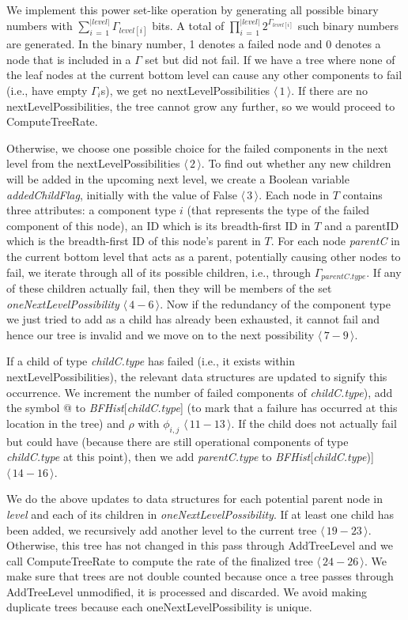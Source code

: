 \documentclass[12pt]{article}
\newcommand{\varName}[1]{\textrm{\it#1}}
\newcommand{\citeLine}[1]{$\langle \, #1 \, \rangle$}
\newcommand{\citeBlock}[2]{$\langle \, #1 - #2 \, \rangle$}
\begin{document}
We implement this power set-like operation by generating all possible binary numbers with $\sum\limits_{i \, = \, 1}^{|level|}\Gamma_{level[i]}$ bits. A total of $\prod\limits_{i \, = \, 1}^{|level|}2^{\Gamma_{level[i]}}$ such binary numbers are generated. In the binary number, 1 denotes a failed node and 0 denotes a node that is included in a $\Gamma$ set but did not fail. If we have a tree where none of the leaf nodes at the current bottom level can cause any other components to fail (i.e., have empty $\Gamma_{i}$s), we get no nextLevelPossibilities \citeLine{1}. If there are no nextLevelPossibilities, the tree cannot grow any further, so we would proceed to ComputeTreeRate. 

Otherwise, we choose one possible choice for the failed components in the next level from the nextLevelPossibilities \citeLine{2}. To find out whether any new children will be added in the upcoming next level, we create a Boolean variable \varName{addedChildFlag}, initially with the value of False \citeLine{3}. Each node in $T$ contains three attributes: a component type $i$ (that represents the type of the failed component of this node), an ID which is its breadth-first ID in $T$ and a parentID which is the breadth-first ID of this node's parent in $T$. For each node \varName{parentC} in the current bottom level that acts as a parent, potentially causing other nodes to fail, we iterate through all of its possible children, i.e., through $\Gamma_{parentC.type}$. If any of these children actually fail, then they will be members of the set \varName{oneNextLevelPossibility} \citeBlock{4}{6}. Now if the redundancy of the component type we just tried to add as a child has already been exhausted, it cannot fail and hence our tree is invalid and we move on to the next possibility \citeBlock{7}{9}.

If a child of type \varName{childC.type} has failed (i.e., it exists within nextLevelPossibilities), the relevant data structures are updated to signify this occurrence. We increment the number of failed components of \varName{childC.type}), add the symbol @ to \varName{BFHist}[\varName{childC.type}] (to mark that a failure has occurred at this location in the tree) and $\rho$ with $\phi_{i, j}$ \citeBlock{11}{13}. If the child does not actually fail but could have (because there are still operational components of type \varName{childC.type} at this point), then we add \varName{parentC.type} to \varName{BFHist}[\varName{childC.type})] \citeBlock{14}{16}.

We do the above updates to data structures for each potential parent node in \varName{level} and each of its children in \varName{oneNextLevelPossibility}. If at least one child has been added, we recursively add another level to the current tree \citeBlock{19}{23}. Otherwise, this tree has not changed in this pass through AddTreeLevel and we call ComputeTreeRate to compute the rate of the finalized tree \citeBlock{24}{26}. We make sure that trees are not double counted because once a tree passes through AddTreeLevel unmodified, it is processed and discarded. We avoid making duplicate trees because each oneNextLevelPossibility is unique.
\end{document}

